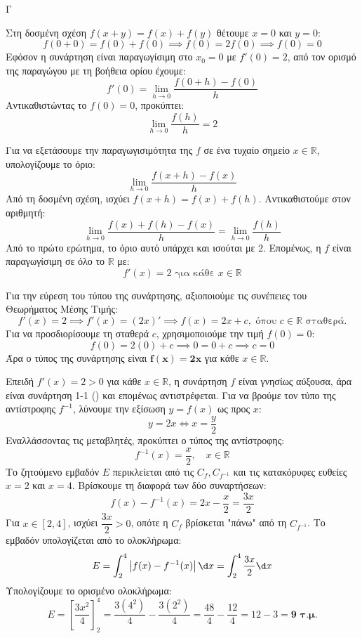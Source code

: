 \begin{thema}{Γ}
\begin{erwthma}
  \item 
  Στη δοσμένη σχέση $f(x+y) = f(x) + f(y)$ θέτουμε $x=0$ και $y=0$:
  \[ f(0+0) = f(0) + f(0) \implies f(0) = 2f(0) \implies f(0) = 0 \]
  Εφόσον η συνάρτηση είναι παραγωγίσιμη στο $x_0=0$ με $f'(0)=2$, από τον ορισμό της παραγώγου με τη βοήθεια ορίου έχουμε:
  \[ f'(0) = \lim_{h \to 0} \frac{f(0+h) - f(0)}{h} \]
  Αντικαθιστώντας το $f(0) = 0$, προκύπτει:
  \[ \lim_{h \to 0} \frac{f(h)}{h} = 2 \]

  \item 
  Για να εξετάσουμε την παραγωγισιμότητα της $f$ σε ένα τυχαίο σημείο $x \in \mathbb{R}$, υπολογίζουμε το όριο:
  \[ \lim_{h \to 0} \frac{f(x+h) - f(x)}{h} \]
  Από τη δοσμένη σχέση, ισχύει $f(x+h) = f(x) + f(h)$. Αντικαθιστούμε στον αριθμητή:
  \[ \lim_{h \to 0} \frac{f(x) + f(h) - f(x)}{h} = \lim_{h \to 0} \frac{f(h)}{h} \]
  Από το πρώτο ερώτημα, το όριο αυτό υπάρχει και ισούται με 2.
  Επομένως, η $f$ είναι παραγωγίσιμη σε όλο το $\mathbb{R}$ με:
  \[ f'(x) = 2 \text{ για κάθε } x \in \mathbb{R} \]
  
  Για την εύρεση του τύπου της συνάρτησης, αξιοποιούμε τις συνέπειες του Θεωρήματος Μέσης Τιμής:
  \[ f'(x) = 2 \implies f'(x) = (2x)' \implies f(x) = 2x + c, \text{ όπου } c \in \mathbb{R} \text{ σταθερά.} \]
  Για να προσδιορίσουμε τη σταθερά $c$, χρησιμοποιούμε την τιμή $f(0) = 0$:
  \[ f(0) = 2(0) + c \implies 0 = 0 + c \implies c = 0 \]
  Άρα ο τύπος της συνάρτησης είναι $\boldsymbol{f(x) = 2x}$ για κάθε $x \in \mathbb{R}$.

  \item 
  Επειδή $f'(x) = 2 > 0$ για κάθε $x \in \mathbb{R}$, η συνάρτηση $f$ είναι γνησίως αύξουσα, άρα είναι συνάρτηση 1-1 () και επομένως αντιστρέφεται.
  Για να βρούμε τον τύπο της αντίστροφης $f^{-1}$, λύνουμε την εξίσωση $y = f(x)$ ως προς $x$:
  \[ y = 2x \Leftrightarrow x = \frac{y}{2} \]
  Εναλλάσσοντας τις μεταβλητές, προκύπτει ο τύπος της αντίστροφης:
  \[ f^{-1}(x) = \frac{x}{2}, \quad x \in \mathbb{R} \]
  Το ζητούμενο εμβαδόν $E$ περικλείεται από τις $C_f, C_{f^{-1}}$ και τις κατακόρυφες ευθείες $x=2$ και $x=4$.
  Βρίσκουμε τη διαφορά των δύο συναρτήσεων:
  \[ f(x) - f^{-1}(x) = 2x - \frac{x}{2} = \frac{3x}{2} \]
  Για $x \in [2, 4]$, ισχύει $\dfrac{3x}{2} > 0$, οπότε η $C_f$ βρίσκεται "πάνω" από τη $C_{f^{-1}}$. Το εμβαδόν υπολογίζεται από το ολοκλήρωμα:
  \[ E = \int_{2}^{4} \left| f(x) - f^{-1}(x) \right| \d x = \int_{2}^{4} \frac{3x}{2} \d x \]
  Υπολογίζουμε το ορισμένο ολοκλήρωμα:
  \[ E = \left[ \frac{3x^2}{4} \right]_{2}^{4} = \frac{3(4^2)}{4} - \frac{3(2^2)}{4} = \frac{48}{4} - \frac{12}{4} = 12 - 3 = \boldsymbol{9 \text{ τ.μ.}} \]
\end{erwthma}
\end{thema}


